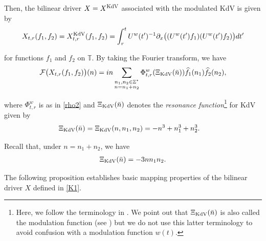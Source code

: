 \documentclass[letterpaper, 11pt,  reqno]{amsart}
\newcommand{\1}{\hspace{0.5mm}\text{I}\hspace{0.5mm}}
\newcommand{\noi}{\noindent}
\newcommand{\Z}{\mathbb{Z}}
\newcommand{\T}{\mathbb{T}}
\newcommand{\F}{\mathcal{F}}
\newcommand{\ft}{\widehat}
\newcommand{\uw}{U^w}
\newcommand{\KDV}{\text{\rm KdV} }
\numberwithin{equation}{section}
\numberwithin{theorem}{section}
\begin{document}
\noi
Then, 
the bilinear driver $X= X^\KDV$ associated with the modulated KdV  is 
given by 
 \begin{align}
X_{t,r}(f_1,f_2)
= X^\KDV_{t,r}(f_1,f_2)
=\int_r^t  \uw(t')^{-1}  \partial_x
\big( (\uw(t')  f_1)( \uw(t') f_2 )\big) dt'
\label{K1}
\end{align}


\noi
for functions $f_1$ and $f_2$ on $\T$.
By taking the Fourier transform, we have
\begin{align}
\F\big(X_{t,r} (f_1,f_2)\big) (n)
= in \sum_{ \substack{n_1, n_2 \in \Z^*\\n = n_1+n_2}}
 \Phi^w_{t,r}(\Xi_\KDV (\bar n))
\ft f_1(n_1)  \ft f_2(n_2),
\label{K2}
\end{align}


\noi
where $\Phi^w_{t,r}$ is as in \eqref{rho2}
and $\Xi_\KDV (\bar n)$ denotes the {\it resonance function}\footnote{Here, we follow
the terminology in \cite{Tao2}.  
We point out that $\Xi_\KDV (\bar n)$ is also called the modulation function (see \cite{KOY})
but we do not use this latter terminology to avoid
confusion with a modulation function $w(t)$.
}
 for KdV given by 
\begin{align}
\Xi_\KDV (\bar n) &  = \Xi_\KDV (n,n_1,n_2) 
= - n^3+ n_1^3 +n_2^3.
\label{K3}
\end{align}

\noi
Recall that, under $n = n_1+ n_2$, we have
\begin{align}
\Xi_\KDV (\bar n) = - 3n n_1 n_2.
\label{K3a}
\end{align}


The following proposition establishes
basic mapping properties
of the bilinear driver $X$ defined in \eqref{K1}.
\end{document}
